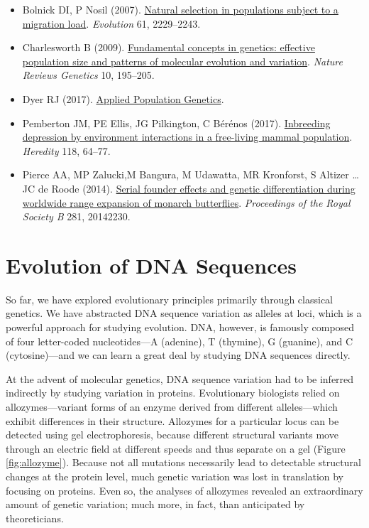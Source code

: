 \documentclass[
]{book}
\begin{document}
\begin{itemize}
\item
  Bolnick DI, P Nosil (2007). \href{https://onlinelibrary.wiley.com/doi/full/10.1111/j.1558-5646.2007.00179.x}{Natural selection in populations subject to a migration load}. \emph{Evolution} 61, 2229--2243.
\item
  Charlesworth B (2009). \href{https://www.nature.com/articles/nrg2526}{Fundamental concepts in genetics: effective population size and patterns of molecular evolution and variation}. \emph{Nature Reviews Genetics} 10, 195--205.
\item
  Dyer RJ (2017). \href{https://dyerlab.github.io/applied_population_genetics/}{Applied Population Genetics}.
\item
  Pemberton JM, PE Ellis, JG Pilkington, C Bérénos (2017). \href{https://www.nature.com/articles/hdy2016100}{Inbreeding depression by environment interactions in a free-living mammal population}. \emph{Heredity} 118, 64--77.
\item
  Pierce AA, MP Zalucki,M Bangura, M Udawatta, MR Kronforst, S Altizer \ldots{} JC de Roode (2014). \href{https://royalsocietypublishing.org/doi/10.1098/rspb.2014.2230}{Serial founder effects and genetic differentiation during worldwide range expansion of monarch butterflies}. \emph{Proceedings of the Royal Society B} 281, 20142230.
\end{itemize}

\hypertarget{evolution-of-dna-sequences}{%
\chapter{Evolution of DNA Sequences}\label{evolution-of-dna-sequences}}

So far, we have explored evolutionary principles primarily through classical genetics. We have abstracted DNA sequence variation as alleles at loci, which is a powerful approach for studying evolution. DNA, however, is famously composed of four letter-coded nucleotides---A (adenine), T (thymine), G (guanine), and C (cytosine)---and we can learn a great deal by studying DNA sequences directly.

At the advent of molecular genetics, DNA sequence variation had to be inferred indirectly by studying variation in proteins. Evolutionary biologists relied on allozymes---variant forms of an enzyme derived from different alleles---which exhibit differences in their structure. Allozymes for a particular locus can be detected using gel electrophoresis, because different structural variants move through an electric field at different speeds and thus separate on a gel (Figure \ref{fig:allozyme}). Because not all mutations necessarily lead to detectable structural changes at the protein level, much genetic variation was lost in translation by focusing on proteins. Even so, the analyses of allozymes revealed an extraordinary amount of genetic variation; much more, in fact, than anticipated by theoreticians.
\end{document}
